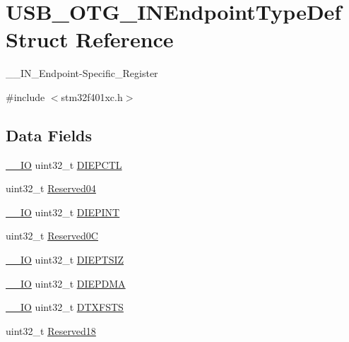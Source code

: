 \hypertarget{struct_u_s_b___o_t_g___i_n_endpoint_type_def}{}\section{U\+S\+B\+\_\+\+O\+T\+G\+\_\+\+I\+N\+Endpoint\+Type\+Def Struct Reference}
\label{struct_u_s_b___o_t_g___i_n_endpoint_type_def}


\+\_\+\+\_\+\+I\+N\+\_\+\+Endpoint-\/\+Specific\+\_\+\+Register  




{\ttfamily \#include $<$stm32f401xc.\+h$>$}

\subsection*{Data Fields}
\begin{DoxyCompactItemize}
\item 
\hyperlink{core__sc300_8h_aec43007d9998a0a0e01faede4133d6be}{\+\_\+\+\_\+\+IO} uint32\+\_\+t \hyperlink{struct_u_s_b___o_t_g___i_n_endpoint_type_def_a840b32fa57faa544c3000ae1d08564c7}{D\+I\+E\+P\+C\+TL}
\item 
uint32\+\_\+t \hyperlink{struct_u_s_b___o_t_g___i_n_endpoint_type_def_acfe7efaa61db86840767dff6d73f8695}{Reserved04}
\item 
\hyperlink{core__sc300_8h_aec43007d9998a0a0e01faede4133d6be}{\+\_\+\+\_\+\+IO} uint32\+\_\+t \hyperlink{struct_u_s_b___o_t_g___i_n_endpoint_type_def_a65f69561c1cefe00ce608b7a3c2d8af5}{D\+I\+E\+P\+I\+NT}
\item 
uint32\+\_\+t \hyperlink{struct_u_s_b___o_t_g___i_n_endpoint_type_def_a1bcc039378b4ed4ac1261a0a758c3d1d}{Reserved0C}
\item 
\hyperlink{core__sc300_8h_aec43007d9998a0a0e01faede4133d6be}{\+\_\+\+\_\+\+IO} uint32\+\_\+t \hyperlink{struct_u_s_b___o_t_g___i_n_endpoint_type_def_a19cf1f1798a062c2a19afe9224e3f938}{D\+I\+E\+P\+T\+S\+IZ}
\item 
\hyperlink{core__sc300_8h_aec43007d9998a0a0e01faede4133d6be}{\+\_\+\+\_\+\+IO} uint32\+\_\+t \hyperlink{struct_u_s_b___o_t_g___i_n_endpoint_type_def_a05fcc63652e936e715223e4423069959}{D\+I\+E\+P\+D\+MA}
\item 
\hyperlink{core__sc300_8h_aec43007d9998a0a0e01faede4133d6be}{\+\_\+\+\_\+\+IO} uint32\+\_\+t \hyperlink{struct_u_s_b___o_t_g___i_n_endpoint_type_def_a44135a03aa87fb60abd479a09f71343d}{D\+T\+X\+F\+S\+TS}
\item 
uint32\+\_\+t \hyperlink{struct_u_s_b___o_t_g___i_n_endpoint_type_def_a716e172ed03ae049eb501ad83207b4ed}{Reserved18}
\end{DoxyCompactItemize}



